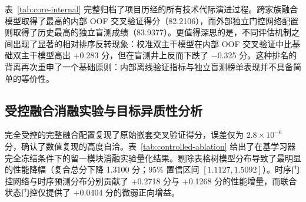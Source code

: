 \documentclass[preprint,12pt,nopreprintline]{elsarticle}
\begin{document}
\begin{table}[htbp]
\centering
\caption{内部工业基准上历史模型体系演进记录。注：OOF 分数为逐行评估得分，盲测分数为官方平台在不同开发评估器下的历史观测记录。}
\label{tab:core-internal}
\end{table}

\newpage
表~\ref{tab:core-internal} 完整归档了项目历经的所有技术代际演进过程。跨家族融合模型取得了最高的内部 OOF 交叉验证得分（82.2106），而外部独立门控网络配置则取得了历史最高的独立盲测成绩（83.9377）。更值得深思的是，不同评估机制之间出现了显著的相对排序反转现象：校准双主干模型在内部 OOF 交叉验证中比基础双主干模型高出 +0.283 分，但在盲测井上反而下跌了 $-$0.325 分。这种排名的背离再次重申了一个基础原则：内部离线验证指标与独立盲测榜单表现并不具备简单的等价性。

\subsection{受控融合消融实验与目标异质性分析}
完全受控的完整融合配置复现了原始嵌套交叉验证得分，误差仅为 $2.8 \times 10^{-6}$ 分，确认了数值复现的高度自洽。表~\ref{tab:controlled-ablation} 给出了在基学习器完全冻结条件下的留一模块消融实验量化结果。剔除表格树模型分布导致了最明显的性能降幅（复合总分下降 1.3100 分；$95\%$ 置信区间 $[1.1127, 1.5092]$）。时序门控网络与时序预测分布分别贡献了 +0.2718 分与 +0.1268 分的性能增量，而联合状态门控仅提供了 +0.0404 分的微弱正向增益。
\end{document}
